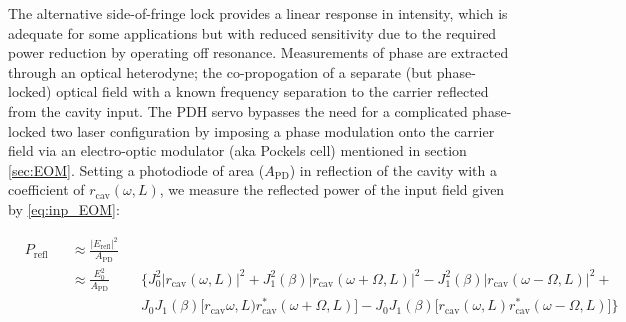 \noindent The alternative side-of-fringe lock provides a linear response in intensity, which is adequate for some applications but with reduced sensitivity due to the required power reduction by operating off resonance. Measurements of phase are extracted through an optical heterodyne; the co-propogation of a separate (but phase-locked) optical field with a known frequency separation to the carrier reflected from the cavity input. The PDH servo bypasses the need for a complicated phase-locked two laser configuration by imposing a phase modulation onto the carrier field via an electro-optic modulator (aka Pockels cell) mentioned in section \ref{sec:EOM}. Setting a photodiode of area ($A_\mathrm{PD}$) in reflection of the cavity with a coefficient of $r_\mathrm{cav}(\omega,L)$, we measure the reflected power of the input field given by \ref{eq:inp_EOM}\;:


%



\begin{equation}
 \begin{alignedat}{3}
    &P_\mathrm{refl} && \approx \frac{|E_\mathrm{refl}|^2}{A_\mathrm{PD}} && \\
    & &&\approx \frac{E_0^2}{A_\mathrm{PD}} && \bigg\{J_0^2 |r_\mathrm{cav}(\omega,L)|^2 + J_1^2(\beta)|r_\mathrm{cav}(\omega+\Omega,L)|^2 - J_1^2(\beta)|r_\mathrm{cav}(\omega-\Omega,L)|^2 +  \\
    & && && J_0J_1(\beta)\big[r_\mathrm{cav}\omega,L) r_\mathrm{cav}^*(\omega+\Omega,L)\big] - J_ 0J_1(\beta)\big[r_\mathrm{cav}(\omega,L)r_\mathrm{cav}^*(\omega-\Omega,L)\big]\bigg\}
  \end{alignedat}
\end{equation}

